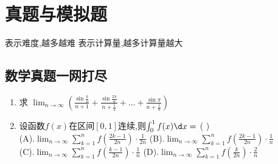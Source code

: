 \documentclass[12pt, a4paper, oneside, UTF8]{ctexbook}
\begin{document}
% 
\else
\fi
\chapter{真题与模拟题}

\begin{tcolorbox}[title=备注]
    \bt 表示难度,越多越难
    \bl 表示计算量,越多计算量越大
\end{tcolorbox}

\section{数学真题一网打尽} 
\begin{enumerate}
    \item \bt[2] 求 $\displaystyle \lim_{n\to\infty}\left(\frac{\sin\frac{\pi}{n}}{n+1}+
    \frac{\sin\frac{2\pi}{n}}{n+\frac{1}{2}}+\ldots+\frac{\sin\pi}{n+\frac{1}{n}}\right)$ 

    
    \item \bt[2] 设函数$f(x)$在区间$\left[0,1\right]$连续,则$\int_{0}^{1}f(x)\d x = $ (   ) \\
    (A).$\displaystyle\lim_{n\to\infty}\sum_{k=1}^{n}f\left(\frac{2k-1}{2n}\right)\cdot\frac{1}{2n}$\qquad
    (B).$\displaystyle\lim_{n\to\infty}\sum_{k=1}^{n}f\left(\frac{2k-1}{2n}\right)\cdot\frac{1}{n}$\\
    (C).$\displaystyle\lim_{n\to\infty}\sum_{k=1}^{n}f\left(\frac{k-1}{2n}\right)\cdot\frac{1}{n}$\qquad
    (D).$\displaystyle\lim_{n\to\infty}\sum_{k=1}^{n}f\left(\frac{k}{2n}\right)\cdot\frac{2}{n}$\qquad


\end{enumerate}
\end{document}
